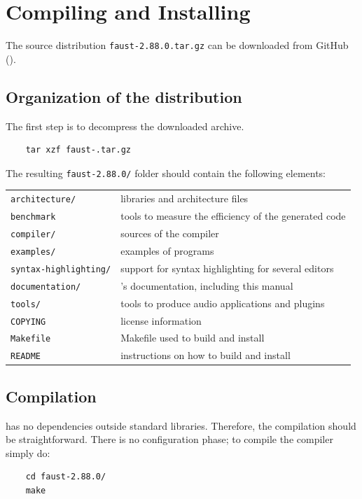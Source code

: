 \chapter{Compiling and Installing \faust}
\label{install}

The \faust source distribution \lstinline'faust-2.88.0.tar.gz' can be downloaded from GitHub ().

\section{Organization of the distribution}
The first step is to decompress the downloaded archive. 
\begin{lstlisting}
	tar xzf faust-.tar.gz
\end{lstlisting}

The resulting \lstinline'faust-2.88.0/' folder should contain the following elements:

\begin{tabular}{ll}
	\lstinline'architecture/' 		&\faust libraries and architecture files\\
	\lstinline'benchmark'			&tools to measure the efficiency of the generated code\\
	\lstinline'compiler/'			&sources of the \faust compiler\\
	\lstinline'examples/'			&examples of \faust programs\\
	\lstinline'syntax-highlighting/'&	support for syntax highlighting for several editors\\
	\lstinline'documentation/' 		&\faust's documentation, including this manual\\
	\lstinline'tools/'				&tools to produce audio applications and plugins\\
	\lstinline'COPYING'			&license information\\
	\lstinline'Makefile'			&Makefile used to build and install \faust\\
	\lstinline'README'			&instructions on how to build and install \faust
\end{tabular}

\section{Compilation}
\faust has no dependencies outside standard libraries. Therefore, the compilation should be straightforward. There is no configuration phase; to compile the \faust compiler simply do:
\begin{lstlisting}
	cd faust-2.88.0/
	make
\end{lstlisting}

